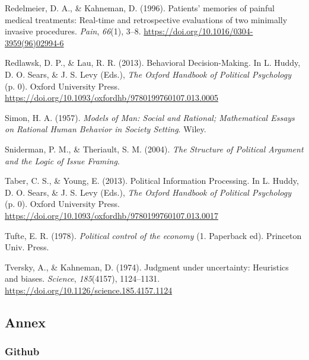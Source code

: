 \documentclass[
]{article}
\newlength{\cslhangindent}
\newlength{\cslentryspacingunit} %
\newenvironment{CSLReferences}[2] %
 {%
  \setlength{\parindent}{0pt}
  \ifodd #1
  \let\oldpar\par
  \def\par{\hangindent=\cslhangindent\oldpar}
  \fi
  \setlength{\parskip}{#2\cslentryspacingunit}
 }%
 {}
\begin{document}
\begin{CSLReferences}{1}{0}
\leavevmode{}%
Redelmeier, D. A., \& Kahneman, D. (1996). Patients' memories of painful
medical treatments: Real-time and retrospective evaluations of two
minimally invasive procedures. \emph{Pain}, \emph{66}(1), 3--8.
\url{https://doi.org/10.1016/0304-3959(96)02994-6}

\leavevmode{}%
Redlawsk, D. P., \& Lau, R. R. (2013). Behavioral {Decision-Making}. In
L. Huddy, D. O. Sears, \& J. S. Levy (Eds.), \emph{The {Oxford Handbook}
of {Political Psychology}} (p. 0). {Oxford University Press}.
\url{https://doi.org/10.1093/oxfordhb/9780199760107.013.0005}

\leavevmode{}%
Simon, H. A. (1957). \emph{Models of {Man}: {Social} and {Rational};
{Mathematical Essays} on {Rational Human Behavior} in {Society
Setting}}. {Wiley}.

\leavevmode{}%
Sniderman, P. M., \& Theriault, S. M. (2004). \emph{The {Structure} of
{Political Argument} and the {Logic} of {Issue Framing}}.

\leavevmode{}%
Taber, C. S., \& Young, E. (2013). Political {Information Processing}.
In L. Huddy, D. O. Sears, \& J. S. Levy (Eds.), \emph{The {Oxford
Handbook} of {Political Psychology}} (p. 0). {Oxford University Press}.
\url{https://doi.org/10.1093/oxfordhb/9780199760107.013.0017}

\leavevmode{}%
Tufte, E. R. (1978). \emph{Political control of the economy} (1.
Paperback ed). {Princeton Univ. Press}.

\leavevmode{}%
Tversky, A., \& Kahneman, D. (1974). Judgment under uncertainty:
{Heuristics} and biases. \emph{Science}, \emph{185}(4157), 1124--1131.
\url{https://doi.org/10.1126/science.185.4157.1124}

\end{CSLReferences}

\newpage

\hypertarget{annex}{%
\subsection{Annex}\label{annex}}

\hypertarget{github}{%
\subsubsection{Github}\label{github}}
\end{document}
